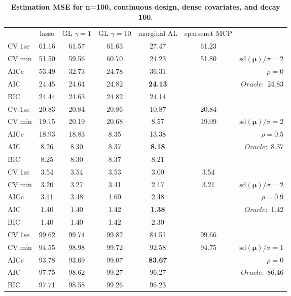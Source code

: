 \clearpage
\begin{table}\vspace{-.5cm}
\caption[l]{ { \bf Estimation MSE for n=100, continuous design, 
dense covariates, and  decay  100}.}
\vspace{-.5cm}
\footnotesize{}
\begin{center}
\begin{tabular}{l*{5}{c}|r}
& lasso & GL $\gamma=1$ & GL $\gamma=10$ & marginal AL & sparsenet MCP  & \\
 \cline{1-7}
CV.1se & 61.16 & 61.57 & 61.63 & 27.47 & 61.23 & \\
CV.min & 51.50 & 59.56 & 60.70 & 24.23 & 51.80 &  $\mathrm{sd}(\mathbf{\mu})/\sigma=2$ \\
AICc & 53.49 & 32.73 & 24.78 & 36.31 & & $\rho=0$ \\
AIC & 24.45 & 24.64 & 24.82 & {\bf 24.13} & &  \multirow{2}{*}{$Oracle: $ 24.83} \\
BIC & 24.44 & 24.63 & 24.82 & 24.14 & &  \\
 \hline 
CV.1se & 20.83 & 20.84 & 20.86 & 10.87 & 20.84 & \\
CV.min & 19.15 & 20.19 & 20.68 & 8.57 & 19.09 &  $\mathrm{sd}(\mathbf{\mu})/\sigma=2$ \\
AICc & 18.93 & 18.83 & 8.35 & 13.38 & & $\rho=0.5$ \\
AIC & 8.26 & 8.30 & 8.37 & {\bf 8.18} & &  \multirow{2}{*}{$Oracle: $ 8.37} \\
BIC & 8.25 & 8.30 & 8.37 & 8.21 & &  \\
 \hline 
CV.1se & 3.54 & 3.54 & 3.53 & 3.00 & 3.54 & \\
CV.min & 3.20 & 3.27 & 3.41 & 2.17 & 3.21 &  $\mathrm{sd}(\mathbf{\mu})/\sigma=2$ \\
AICc & 3.11 & 3.48 & 1.60 & 2.48 & & $\rho=0.9$ \\
AIC & 1.40 & 1.40 & 1.42 & {\bf 1.38} & &  \multirow{2}{*}{$Oracle: $ 1.42} \\
BIC & 1.40 & 1.40 & 1.42 & 2.30 & &  \\
 \hline 
CV.1se & 99.62 & 99.74 & 99.82 & 84.51 & 99.66 & \\
CV.min & 94.55 & 98.98 & 99.72 & 92.58 & 94.75 &  $\mathrm{sd}(\mathbf{\mu})/\sigma=1$ \\
AICc & 93.78 & 93.69 & 99.07 & {\bf 83.67} & & $\rho=0$ \\
AIC & 97.75 & 98.62 & 99.27 & 96.27 & &  \multirow{2}{*}{$Oracle: $ 86.46} \\
BIC & 97.71 & 98.58 & 99.26 & 96.23 & &  \\

\end{tabular}
\end{center}
\end{table}
